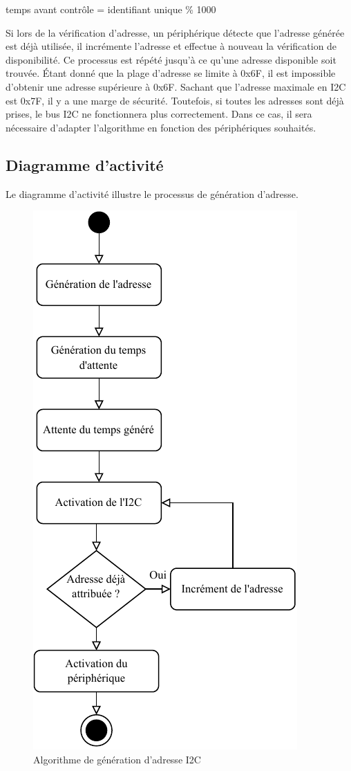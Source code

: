 \begin{center}
    temps avant contrôle = identifiant unique \% 1000
\end{center}

Si lors de la vérification d'adresse, un périphérique détecte que l'adresse générée est déjà utilisée, il incrémente l'adresse et effectue à nouveau la vérification de disponibilité.
Ce processus est répété jusqu'à ce qu'une adresse disponible soit trouvée.
Étant donné que la plage d'adresse se limite à 0x6F, il est impossible d'obtenir une adresse supérieure à 0x6F.
Sachant que l'adresse maximale en I2C est 0x7F, il y a une marge de sécurité.
Toutefois, si toutes les adresses sont déjà prises, le bus I2C ne fonctionnera plus correctement.
Dans ce cas, il sera nécessaire d'adapter l'algorithme en fonction des périphériques souhaités.

\newpage
\subsection{Diagramme d'activité}

Le diagramme d'activité illustre le processus de génération d'adresse.

\begin{figure}[H]
    \centering
    \includegraphics[scale=1.3]{./assets/figures/gen_addr.pdf}
    \caption{Algorithme de génération d'adresse I2C}
\end{figure}

